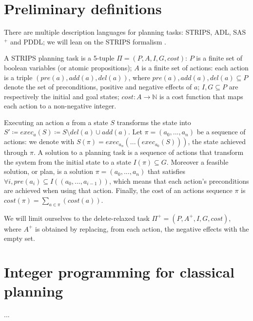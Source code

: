 \section{Preliminary definitions}
There are multiple description languages for planning tasks: STRIPS, ADL, SAS$^+$ and PDDL; we will lean on the STRIPS formalism \cite{Fikes_71}.

A STRIPS planning task is a 5-tuple $\Pi=(P,A,I,G,cost)$: $P$ is a finite set of boolean variables (or atomic propositions); $A$ is a finite set of actions: each action is a triple $(pre(a), add(a), del(a))$, where $pre(a),add(a),del(a)\subseteq P$ denote the set of preconditions, positive and negative effects of $a$; $I,G\subseteq P$ are respectively the initial and goal states; $cost:A\to\mathbb{N}$ is a cost function that maps each action to a non-negative integer.

Executing an action $a$ from a state $S$ transforms the state into $S'\coloneq exec_a(S)\coloneq S\setminus del(a)\cup add(a)$.
Let $\pi=(a_0,...,a_n)$ be a sequence of actions: we denote with $S(\pi)=exec_{a_n}(...(exec_{a_0}(S)))$, the state achieved through $\pi$.
A solution to a planning task is a sequence of actions that transform the system from the initial state to a state $I(\pi)\subseteq G$. Moreover a feasible solution, or plan, is a solution $\pi=(a_0,...,a_n)$ that satisfies $\forall i,pre(a_i)\subseteq I((a_0,...,a_{i-1}))$, which means that each action's preconditions are achieved when using that action. Finally, the cost of an actions sequence $\pi$ is $cost(\pi)=\sum_{a\in\pi}(cost(a))$.

We will limit ourselves to the delete-relaxed task $\Pi^+=(P,A^+,I,G,cost)$, where $A^+$ is obtained by replacing, from each action, the negative effects with the empty set.

\section{Integer programming for classical planning}
...